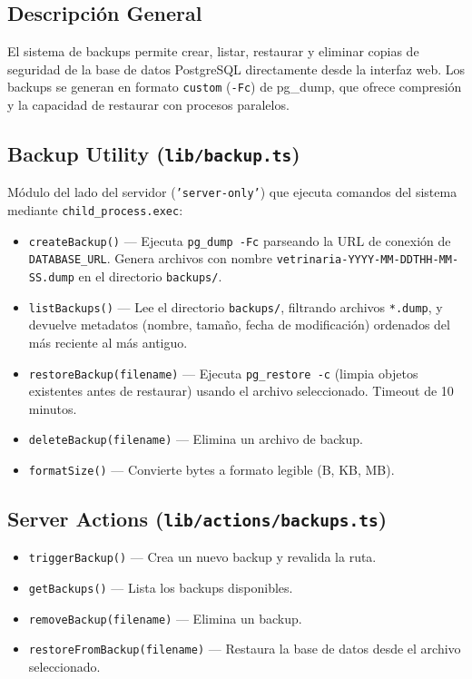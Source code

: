 \documentclass[12pt,a4paper]{article}
\begin{document}
\subsection{Descripción General}

El sistema de backups permite crear, listar, restaurar y eliminar copias de
seguridad de la base de datos PostgreSQL directamente desde la interfaz web.
Los backups se generan en formato \texttt{custom} (\texttt{-Fc}) de pg\_dump,
que ofrece compresión y la capacidad de restaurar con procesos paralelos.

\subsection{Backup Utility (\texttt{lib/backup.ts})}

Módulo del lado del servidor (\texttt{'server-only'}) que ejecuta comandos
del sistema mediante \texttt{child\_process.exec}:

\begin{itemize}[leftmargin=*]
    \item \texttt{createBackup()} --- Ejecuta \texttt{pg\_dump -Fc} parseando
          la URL de conexión de \texttt{DATABASE\_URL}. Genera archivos con
          nombre \texttt{vetrinaria-YYYY-MM-DDTHH-MM-SS.dump} en el directorio
          \texttt{backups/}.
    \item \texttt{listBackups()} --- Lee el directorio \texttt{backups/},
          filtrando archivos \texttt{*.dump}, y devuelve metadatos (nombre,
          tamaño, fecha de modificación) ordenados del más reciente al más
          antiguo.
    \item \texttt{restoreBackup(filename)} --- Ejecuta \texttt{pg\_restore -c}
          (limpia objetos existentes antes de restaurar) usando el archivo
          seleccionado. Timeout de 10 minutos.
    \item \texttt{deleteBackup(filename)} --- Elimina un archivo de backup.
    \item \texttt{formatSize()} --- Convierte bytes a formato legible (B, KB, MB).
\end{itemize}

\subsection{Server Actions (\texttt{lib/actions/backups.ts})}

\begin{itemize}[leftmargin=*]
    \item \texttt{triggerBackup()} --- Crea un nuevo backup y revalida la ruta.
    \item \texttt{getBackups()} --- Lista los backups disponibles.
    \item \texttt{removeBackup(filename)} --- Elimina un backup.
    \item \texttt{restoreFromBackup(filename)} --- Restaura la base de datos
          desde el archivo seleccionado.
\end{itemize}
\end{document}
